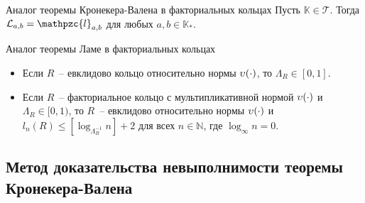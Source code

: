 \documentclass[8pt, xcolor=x11names]{beamer}
\begin{document}
\begin{frame}
    \begin{block}{Аналог теоремы Кронекера-Валена в факториальных кольцах}
        Пусть $\mathbb{K}\in\mathcal{T}$.
        Тогда $\mathcal{L}_{a,b}=\mathpzc{l}_{a,b}$ для любых $a,b\in\mathbb{K}_{*}$.
    \end{block}

    \begin{block}{Аналог теоремы Ламе в факториальных кольцах}
        \begin{itemize}
            \item Если $R$~-- евклидово кольцо относительно нормы $\upsilon(\cdot)$, то $\Lambda_R \in [0, 1]$.

            \item Если $R$~-- факториальное кольцо с мультипликативной нормой $\upsilon(\cdot)$ и $\Lambda_R \in [0, 1)$, то $R$~-- евклидово относительно нормы $\upsilon(\cdot)$ и $l_n(R) \le [\log_{\Lambda_R^{-1}} n] + 2$ для всех $n \in \mathbb{N}$, где $\log_{\infty} n = 0$.
        \end{itemize}
    \end{block}
\end{frame}

\subsection{Метод доказательства невыполнимости теоремы Кронекера-Валена}
\end{document}
